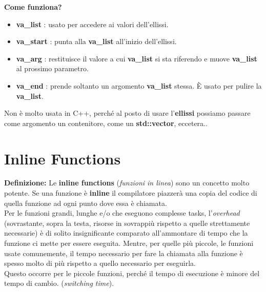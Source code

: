 \textsf{\small \textbf{Come funziona?}} \\

\begin{itemize}
	\item \textsf{\small \textbf{va\_list} : usato per accedere ai valori dell'ellissi.}
	\item \textsf{\small \textbf{va\_start} : punta alla \textbf{va\_list} all'inizio dell'ellissi.}
	\item \textsf{\small \textbf{va\_arg} : restituisce il valore a cui \textbf{va\_list} si sta riferendo e muove \textbf{va\_list} al prossimo parametro.}
	\item \textsf{\small \textbf{va\_end} : prende soltanto un argomento \textbf{va\_list} stessa. È usato per pulire la \textbf{va\_list}.}
\end{itemize}

\textsf{\small Non è molto usata in C++, perché al posto di usare l'\textbf{ellissi} possiamo passare come argomento un contenitore, come un \textbf{std::vector}, eccetera..} \\


\newpage

\section{Inline Functions}

\textsf{\small \textbf{Definizione: } Le \textbf{inline functions} (\emph{funzioni in linea}) sono un concetto molto potente. Se una funzione è \textbf{inline} il compilatore piazzerà una copia del codice di quella funzione ad ogni punto dove essa è chiamata.} \\

\textsf{\small Per le funzioni grandi, lunghe e/o che eseguono complesse tasks,	l'\emph{overhead} (sovrastante, sopra la testa, risorse in sovrappiù rispetto a quelle strettamente necessarie) è di solito insignificante comparato all'ammontare di tempo che la funzione ci mette per essere eseguita. Mentre, per quelle più piccole, le funzioni usate comunemente, il tempo necessario per fare la chiamata alla funzione è spesso molto di più rispetto a quello necessario per eseguirla.} \\

\textsf{\small Questo occorre per le piccole funzioni, perché il tempo di esecuzione è minore del tempo di cambio. (\emph{switching time}).} \break

